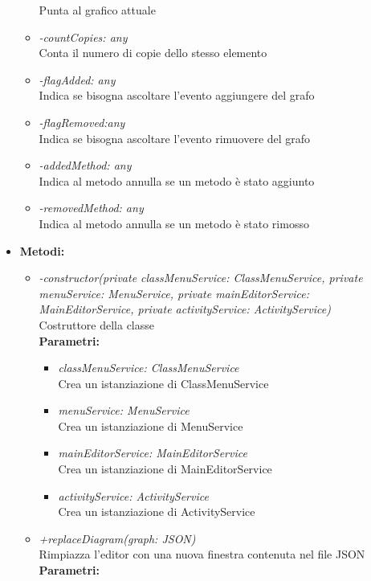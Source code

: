 \begin{itemize}
\begin{itemize}
			Punta al grafico attuale
			\item \emph{-countCopies: any}\\
			Conta il numero di copie dello stesso elemento
			\item \emph{-flagAdded: any}\\
			Indica se bisogna ascoltare l'evento aggiungere del grafo
			\item \emph{-flagRemoved:any}\\
			Indica se bisogna ascoltare l'evento rimuovere del grafo
			\item \emph{-addedMethod: any}\\
			Indica al metodo annulla se un metodo è stato aggiunto
			\item \emph{-removedMethod: any}\\
			Indica al metodo annulla se un metodo è stato rimosso
		\end{itemize}
	\item \textbf{Metodi:}
		\begin{itemize}
			\item \emph{-constructor(private classMenuService: ClassMenuService, private menuService: MenuService, private mainEditorService: MainEditorService, private activityService: ActivityService)}\\
    		Costruttore della classe\\
    		\textbf{Parametri:}
    		\begin{itemize}
    			\item \emph{classMenuService: ClassMenuService}\\
    			Crea un istanziazione di ClassMenuService
    			\item \emph{menuService: MenuService}\\
    			Crea un istanziazione di MenuService
    			\item \emph{mainEditorService: MainEditorService}\\
    			Crea un istanziazione di MainEditorService
    			\item \emph{activityService: ActivityService}\\
    			Crea un istanziazione di ActivityService
    		\end{itemize}
    		\item \emph{+replaceDiagram(graph: JSON)}\\
    		Rimpiazza l'editor con una nuova finestra contenuta nel file JSON\\
    		\textbf{Parametri:}
    		\begin{itemize}

\end{itemize}
\end{itemize}
\end{itemize}
